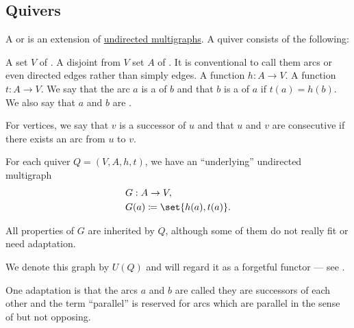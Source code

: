 \subsection{Quivers}\label{subsec:quivers}

\begin{definition}\label{def:quiver}
  A  or  is an extension of \hyperref[def:undirected_multigraph]{undirected multigraphs}. A quiver consists of the following:
  \begin{thmenum}
     A set \( V \) of .
     A disjoint from \( V \) set \( A \) of . It is conventional to call them arcs or even directed edges rather than simply edges.
     A  function \( h: A \to V \).
     A  function \( t: A \to V \).
     We say that the arc \( a \) is a  of \( b \) and that \( b \) is a  of \( a \) if \( t(a) = h(b) \). We also say that \( a \) and \( b \) are .

    For vertices, we say that \( v \) is a successor of \( u \) and that \( u \) and \( v \) are consecutive if there exists an arc from \( u \) to \( v \).

     For each quiver \( Q = (V, A, h, t) \), we have an \enquote{underlying} undirected multigraph
    \begin{equation}\label{eq:def:quiver/forgetful}
      \begin{aligned}
        &G: A \to V, \\
        &G(a) \coloneqq \set{ h(a), t(a) }.
      \end{aligned}
    \end{equation}

    All properties of \( G \) are inherited by \( Q \), although some of them do not really fit or need adaptation.

    We denote this graph by \( U(Q) \) and will regard it as a forgetful functor --- see .

     One adaptation is that the arcs \( a \) and \( b \) are called  they are successors of each other and the term \enquote{parallel} is reserved for arcs which are parallel in the sense of  but not opposing.


\end{thmenum}
\end{definition}
